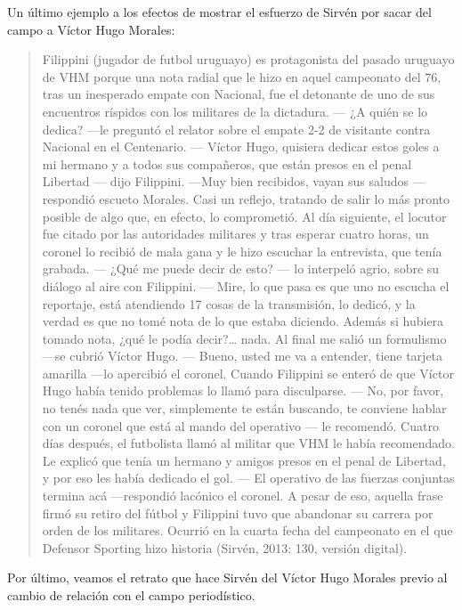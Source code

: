 {Un último ejemplo a los efectos de mostrar el esfuerzo de Sirvén por sacar del campo a Víctor Hugo Morales:

\begin{quote}
Filippini (jugador de futbol uruguayo) es protagonista del pasado uruguayo de VHM porque una nota radial que le hizo en aquel campeonato del 76, tras un inesperado empate con Nacional, fue el detonante de uno de sus encuentros ríspidos con los militares de la dictadura. --- ¿A quién se lo dedica? ---le preguntó el relator sobre el empate 2-2 de visitante contra Nacional en el Centenario. --- Víctor Hugo, quisiera dedicar estos goles a mi hermano y a todos sus compañeros, que están presos en el penal Libertad --- dijo Filippini. ---Muy bien recibidos, vayan sus saludos ---respondió escueto Morales. Casi un reflejo, tratando de salir lo más pronto posible de algo que, en efecto, lo comprometió. Al día siguiente, el locutor fue citado por las autoridades militares y tras esperar cuatro horas, un coronel lo recibió de mala gana y le hizo escuchar la entrevista, que tenía grabada. --- ¿Qué me puede decir de esto? --- lo interpeló agrio, sobre su diálogo al aire con Filippini. --- Mire, lo que pasa es que uno no escucha el reportaje, está atendiendo 17 cosas de la transmisión, lo dedicó, y la verdad es que no tomé nota de lo que estaba diciendo. Además si hubiera tomado nota, ¿qué le podía decir?\ldots{} nada. Al final me salió un formulismo ---se cubrió Víctor Hugo. --- Bueno, usted me va a entender, tiene tarjeta amarilla ---lo apercibió el coronel. Cuando Filippini se enteró de que Víctor Hugo había tenido problemas lo llamó para disculparse. --- No, por favor, no tenés nada que ver, simplemente te están buscando, te conviene hablar con un coronel que está al mando del operativo --- le recomendó. Cuatro días después, el futbolista llamó al militar que VHM le había recomendado. Le explicó que tenía un hermano y amigos presos en el penal de Libertad, y por eso les había dedicado el gol. --- El operativo de las fuerzas conjuntas termina acá ---respondió lacónico el coronel. A pesar de eso, aquella frase firmó su retiro del fútbol y Filippini tuvo que abandonar su carrera por orden de los militares. Ocurrió en la cuarta fecha del campeonato en el que Defensor Sporting hizo historia (Sirvén, 2013: 130, versión digital).
\end{quote}

Por último, veamos el retrato que hace Sirvén del Víctor Hugo Morales previo al cambio de relación con el campo periodístico.

}
